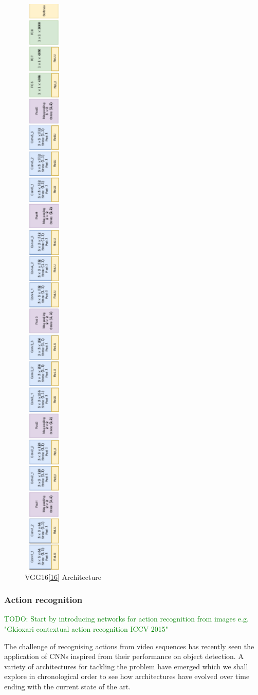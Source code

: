 \documentclass[A4paper,draft]{scrreprt}
\begin{document}
\begin{figure}
\centering
\includegraphics[width=2.00000cm,height=1.00000\textwidth]{media/images/vgg16-rotated90.pdf}
\caption{VGG16{[}\protect\hyperlink{ref-simonyan2014_VeryDeepConvolutional}{16}{]}
Architecture}\label{fig:architecture:vgg16}
\end{figure}

\subsubsection{Action recognition}\label{action-recognition}

\textcolor{green}{TODO: Start by introducing networks for action recognition from images e.g.
"Gkioxari contextual action recognition ICCV 2015"}\newline

The challenge of recognising actions from video sequences has recently
seen the application of CNNs inspired from their performance on object
detection. A variety of architectures for tackling the problem have
emerged which we shall explore in chronological order to see how
architectures have evolved over time ending with the current state of
the art.
\end{document}
